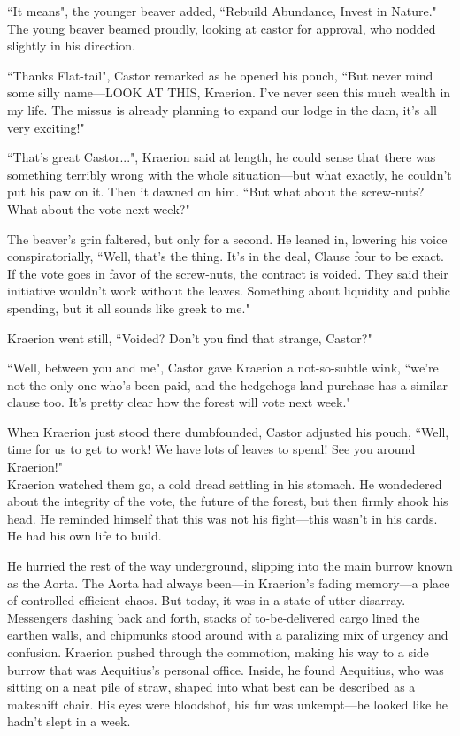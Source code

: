 ``It means", the younger beaver added, ``Rebuild Abundance, Invest in Nature." The young beaver beamed proudly, looking at castor for approval, who nodded slightly in his direction.

``Thanks Flat-tail", Castor remarked as he opened his pouch, ``But never mind some silly name---LOOK AT THIS, Kraerion. I've never seen this much wealth in my life. The missus is already planning to expand our lodge in the dam, it's all very exciting!"

``That's great Castor...", Kraerion said at length, he could sense that there was something terribly wrong with the whole situation---but what exactly, he couldn't put his paw on it. Then it dawned on him. ``But what about the screw-nuts? What about the vote next week?"

The beaver's grin faltered, but only for a second. He leaned in, lowering his voice conspiratorially, ``Well, that's the thing. It's in the deal, Clause four to be exact. If the vote goes in favor of the screw-nuts, the contract is voided. They said their initiative wouldn't work without the leaves. Something about liquidity and public spending, but it all sounds like greek to me."

Kraerion went still, ``Voided? Don't you find that strange, Castor?"

``Well, between you and me", Castor gave Kraerion a not-so-subtle wink, ``we're not the only one who's been paid, and the hedgehogs land purchase has a similar clause too. It's pretty clear how the forest will vote next week."

When Kraerion just stood there dumbfounded, Castor adjusted his pouch, ``Well, time for us to get to work! We have lots of leaves to spend! See you around Kraerion!"\\

Kraerion watched them go, a cold dread settling in his stomach. He wondedered about the integrity of the vote, the future of the forest, but then firmly shook his head.
He reminded himself that this was not his fight---this wasn't in his cards. He had his own life to build.

He hurried the rest of the way underground, slipping into the main burrow known as the Aorta. The Aorta had always been---in Kraerion's fading memory---a place of controlled efficient chaos. But today, it was in a state of utter disarray. Messengers dashing back and forth, stacks of to-be-delivered cargo lined the earthen walls, and chipmunks stood around with a paralizing mix of urgency and confusion.
Kraerion pushed through the commotion, making his way to a side burrow that was Aequitius's personal office. Inside, he found Aequitius, who was sitting on a neat pile of straw, shaped into what best can be described as a makeshift chair. His eyes were bloodshot, his fur was unkempt---he looked like he hadn't slept in a week.

